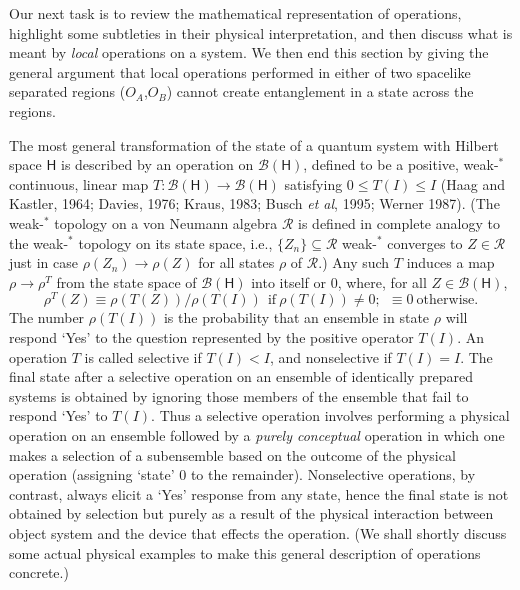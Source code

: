 \documentclass[12pt]{article}
\newcommand{\alg}[1]{\mbox{$\mathcal{#1}$}}
\newcommand{\hil}[1]{\mbox{$\mathsf{#1}$}}
\begin{document}
Our next task is to review the mathematical representation of  
operations, highlight some subtleties in their physical 
interpretation, and then discuss what is meant by 
\emph{local} operations on a system.  We then end this section by 
giving the general argument 
that 
local operations performed in either of two spacelike separated 
regions ($O_{A}$,$O_{B}$) cannot 
create entanglement in a state across the regions. 

The most general transformation of the state of a quantum system with 
Hilbert space $\hil{H}$ is described 
by an operation on $\alg{B}(\hil{H})$,  
defined to be a positive, weak-$^{*}$ continuous, linear map $T: 
\alg{B}(\hil{H})\rightarrow\alg{B}(\hil{H})$ satisfying 
$0\leq T(I)\leq I$ (Haag and Kastler, 1964; Davies, 1976; Kraus, 1983; 
Busch \emph{et al}, 1995; Werner 1987).
(The weak-$^{*}$ topology on a von Neumann algebra $\alg{R}$ is 
defined in complete analogy to the weak-$^{*}$ topology on its state space, 
i.e., $\{Z_{n}\}\subseteq \alg{R}$ weak-$^{*}$ converges 
to $Z\in\alg{R}$ just in case 
$\rho(Z_{n})\rightarrow\rho(Z)$ for all 
states $\rho$ of $\alg{R}$.)  
Any such $T$ induces a 
map $\rho\rightarrow\rho^{T}$ from the state space 
of $\alg{B}(\hil{H})$ into itself or $0$, where, for all $Z\in \alg{B}(\hil{H})$,
\begin{equation} 
\rho^{T}(Z)\equiv\rho(T(Z))/\rho(T(I))\ \ \mbox{if}\ 
\rho(T(I))\not=0;\ \ \equiv 0\ \mbox{otherwise}.  
\end{equation}
The number 
$\rho(T(I))$ is the probability that an ensemble 
in state $\rho$ will respond `Yes' to the question represented by the 
positive operator
$T(I)$.  
An operation 
$T$ is called selective if $T(I)<I$, and nonselective if 
$T(I)=I$.  
The final state after a selective operation on an ensemble 
of identically prepared systems  is obtained by ignoring those members of the 
ensemble that fail to respond `Yes' to $T(I)$.  Thus a selective 
operation involves 
performing a physical operation on an ensemble followed by a \emph{purely conceptual}
operation in which one makes a selection of a subensemble based on 
the outcome of the physical operation  (assigning `state' $0$ to the 
remainder).  
Nonselective operations, by contrast, always elicit a `Yes' 
response from any state, hence the final state is not obtained by 
selection but purely as a result of the physical interaction between 
object system and the device that effects the operation.  (We shall 
shortly discuss some actual physical examples to make this general 
description of operations concrete.)  
\end{document}
